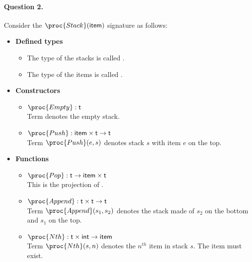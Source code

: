 \paragraph{Question 2.} Consider the
\(\proc{Stack}(\type{item})\) signature as follows:
  \begin{itemize}

    \item \textbf{Defined types}

    \begin{itemize}

      \item The type of the stacks is called .

      \item The type of the items is called .

    \end{itemize}

    \item \textbf{Constructors}

    \begin{itemize}

      \item \(\proc{Empty} : \type{t}\)\\
       Term  denotes the empty stack.

      \item \(\proc{Push} : \type{item} \times \type{t} \rightarrow
        \type{t}\)\\
      Term \(\proc{Push} (e, s)\) denotes stack \(s\) with
      item \(e\) on the top.

    \end{itemize}

    \item \textbf{Functions}

    \begin{itemize}

      \item \(\proc{Pop} : \type{t} \rightarrow \type{item} \times
        \type{t}\)\\
      This is the projection of .

      \item \(\proc{Append} : \type{t} \times \type{t} \rightarrow
        \type{t}\)\\
      Term \(\proc{Append} (s_1, s_2)\) denotes the stack
      made of \(s_2\) on the bottom and \(s_1\) on the top.

      \item \(\proc{Nth} : \type{t} \times \type{int} \rightarrow
        \type{item}\)\\
      Term \(\proc{Nth} (s, n)\) denotes the \(n^{th}\) item
      in stack \(s\). The item must exist.


\end{itemize}
\end{itemize}
